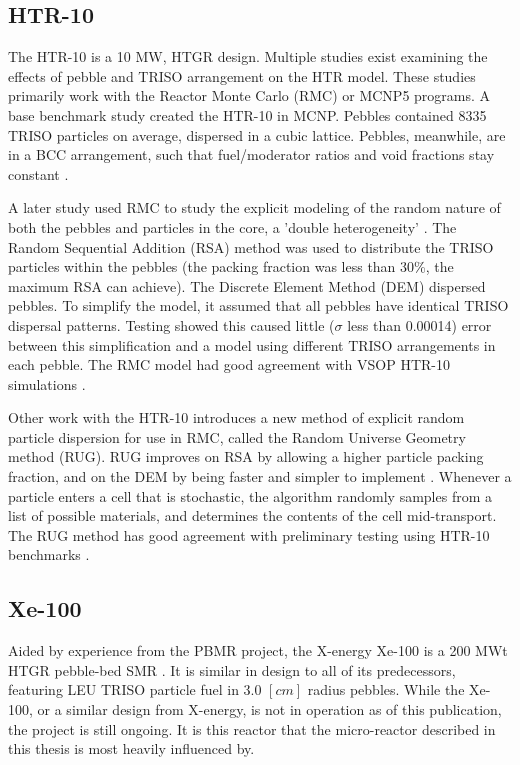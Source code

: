 \subsection{HTR-10}

The HTR-10 is a 10 MW, HTGR design.  Multiple studies exist examining the effects of pebble and TRISO arrangement on the HTR model.  These studies primarily work with the Reactor Monte Carlo (RMC) or MCNP5 programs.  A base benchmark study created the HTR-10 in MCNP.  Pebbles contained 8335 TRISO particles on average, dispersed in a cubic lattice.  Pebbles, meanwhile, are in a BCC arrangement, such that fuel/moderator ratios and void fractions stay constant \cite{kim_monte_2005}.

A later study used RMC to study the explicit modeling of the random nature of both the pebbles and particles in the core, a 'double heterogeneity' \cite{she_explicit_2015}.  The Random Sequential Addition (RSA) method was used to distribute the TRISO particles within the pebbles (the packing fraction was less than 30\%, the maximum RSA can achieve).  The Discrete Element Method (DEM) dispersed pebbles.  To simplify the model, it assumed that all pebbles have identical TRISO dispersal patterns.  Testing showed this caused little ($\sigma$ less than 0.00014) error between this simplification and a model using different TRISO arrangements in each pebble.  The RMC model had good agreement with VSOP HTR-10 simulations \cite{she_explicit_2015}.

Other work with the HTR-10 introduces a new method of explicit random particle dispersion for use in RMC, called the Random Universe Geometry method (RUG).  RUG improves on RSA by allowing a higher particle packing fraction, and on the DEM by being faster and simpler to implement \cite{liu_random_2018}.  Whenever a particle enters a cell that is stochastic, the algorithm randomly samples from a list of possible materials, and determines the contents of the cell mid-transport.  The RUG method has good agreement with preliminary testing using HTR-10 benchmarks \cite{liu_random_2018}.

\subsection{Xe-100}
\label{sec:xe-100}

Aided by experience from the PBMR project, the X-energy Xe-100 is a 200 MWt HTGR pebble-bed SMR \cite{harlan_x-energy_2018, harlan_ans_2017}.  It is similar in design to all of its predecessors, featuring LEU TRISO particle fuel in 3.0 $\left[cm\right]$ radius pebbles.  While the Xe-100, or a similar design from X-energy, is not in operation as of this publication, the project is still ongoing.  It is this reactor that the micro-reactor described in this thesis is most heavily influenced by.

